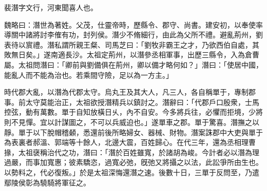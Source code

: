 
\begin{pinyinscope}
裴潛字文行，河東聞喜人也。

魏略曰：潛世為著姓。父茂，仕靈帝時，歷縣令、郡守、尚書。建安初，以奉使率導關中諸將討李傕有功，封列侯。潛少不脩細行，由此為父所不禮。避亂荊州，劉表待以賔禮。潛私謂所親王粲、司馬芝曰：「劉牧非霸王之才，乃欲西伯自處，其敗無日矣。」遂南適長沙。太祖定荊州，以潛參丞相軍事，出歷三縣令，入為倉曹屬。太祖問潛曰：「卿前與劉備俱在荊州，卿以備才略何如？」潛曰：「使居中國，能亂人而不能為治也。若乘間守險，足以為一方主。」

時代郡大亂，以潛為代郡太守。烏丸王及其大人，凡三人，各自稱單于，專制郡事。前太守莫能治正，太祖欲授潛精兵以鎮討之。潛辭曰：「代郡戶口殷衆，士馬控弦，動有萬數。單于自知放橫日乆，內不自安。今多將兵往，必懼而拒境，少將則不見憚。宜以計謀圖之，不可以兵威迫也。」遂單車之郡。單于驚喜。潛撫之以靜。單于以下脫帽稽顙，悉還前後所略婦女、器械、財物。潛案誅郡中大吏與單于為表裏者郝溫、郭端等十餘人，北邊大震，百姓歸心。在代三年，還為丞相理曹掾，太祖襃稱治代之功，潛曰：「潛於百姓雖寬，於諸胡為峻。今計者必以潛為理過嚴，而事加寬惠；彼素驕恣，過寬必弛，旣弛又將攝之以法，此訟爭所由生也。以勢料之，代必復叛。」於是太祖深悔還潛之速。後數十日，三單于反問至，乃遣鄢陵侯彰為驍騎將軍征之。


\end{pinyinscope}
